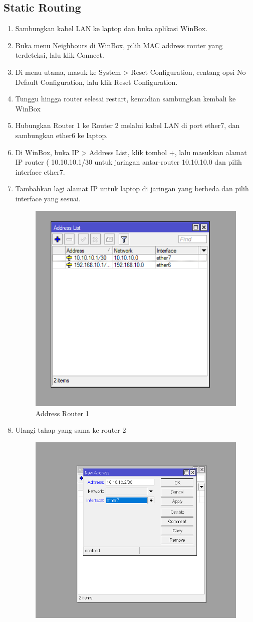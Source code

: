 \subsection{Static Routing}
\begin{enumerate}
    \item Sambungkan kabel LAN ke laptop dan buka aplikasi WinBox.
    \item Buka menu Neighbours di WinBox, pilih MAC address router yang terdeteksi, lalu klik Connect.
    \item Di menu utama, masuk ke System > Reset Configuration, centang opsi No Default Configuration, lalu klik Reset Configuration.
    \item Tunggu hingga router selesai restart, kemudian sambungkan kembali ke WinBox
    \item Hubungkan Router 1 ke Router 2 melalui kabel LAN di port ether7, dan sambungkan ether6 ke laptop.
    \item Di WinBox, buka IP > Address List, klik tombol +, lalu masukkan alamat IP router ( 10.10.10.1/30 untuk jaringan antar-router 10.10.10.0 dan pilih interface ether7.
    \item Tambahkan lagi alamat IP untuk laptop di jaringan yang berbeda dan pilih interface yang sesuai.
    \begin{figure}[H]
        \centering
        \includegraphics[width=0.5\linewidth]{address list static.png}
        \caption{Address Router 1}
        \label{fig:enter-label}
    \end{figure}
    \item Ulangi tahap yang sama ke router 2
    \begin{figure}[H]
        \centering
        \includegraphics[width=0.5\linewidth]{address router 2.png}

\end{figure}
\end{enumerate}
